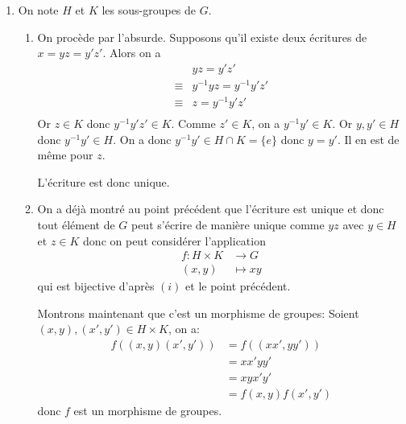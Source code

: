 {\begin{td-sol}[]
\begin{enumerate}
            \item On note \(H\) et \(K\) les sous-groupes de \(G\).
            \begin{enumerate}
                \item On procède par l'absurde. Supposons qu'il existe deux
                écritures de \(x=yz=y'z'\). Alors on a
                \begin{equation*}
                    \begin{aligned}
                        &yz = y'z'\\
                        \equiv &y^{-1}yz = y^{-1}y'z'\\
                        \equiv &z = y^{-1}y'z'\\
                    \end{aligned}
                \end{equation*}
                Or \(z\in K\) donc \(y^{-1}y'z'\in K\). Comme \(z'\in K\),
                on a \(y^{-1}y'\in K\). Or \(y,y'\in H\) donc \(y^{-1}y'\in H\).
                On a donc \(y^{-1}y'\in H\cap K = \{e\}\) donc \(y=y'\).
                Il en est de même pour \(z\).

                L'écriture est donc unique.

                \item On a déjà montré au point précédent que l'écriture
                est unique et donc tout élément de \(G\) peut s'écrire
                de manière unique comme \(yz\) avec \(y\in H\) et \(z\in K\)
                donc on peut considérer l'application
                \begin{equation*}
                    \begin{aligned}
                        f\colon H\times K &\to G\\
                        (x,y) &\mapsto xy
                    \end{aligned}
                \end{equation*}
                qui est bijective d'après \((i)\) et le point précédent.

                Montrons maintenant que c'est un morphisme de groupes:
                Soient \((x,y), (x',y')\in H\times K\), on a:
                \begin{equation*}
                    \begin{aligned}
                        f((x,y)(x',y')) &= f((xx',yy'))\\
                        &= xx'yy'\\
                        &= xyx'y'\\
                        &= f(x,y)f(x',y')
                    \end{aligned}
                \end{equation*}
                donc \(f\) est un morphisme de groupes.


\end{enumerate}
\end{enumerate}
\end{td-sol}}
